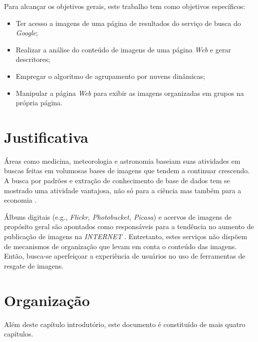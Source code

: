 Para alcançar os objetivos gerais, este trabalho tem como objetivos específicos:

\begin{itemize}

\item Ter acesso a imagens de uma página de resultados do serviço de busca do \emph{Google};

\item Realizar a análise do conteúdo de imagens de uma página \emph{Web} e gerar descritores;

\item Empregar o algoritmo de agrupamento por nuvens dinâmicas;

\item Manipular a página \emph{Web} para exibir as imagens organizadas em grupos na própria página.

\end{itemize}

\section{Justificativa}
\begin{comment}
\textbf{Justificativa está muito seca, coloque mais coisas: buscas em bancos de imagens, aplicações médicas, busca de padrões para fenômenos climáticos através de fotos de satélite, etc...}
\end{comment}

Áreas como medicina, meteorologia e astronomia baseiam suas atividades em buscas feitas em volumosas bases de imagens que tendem a continuar crescendo. A busca por padrões e extração de conhecimento de base de dados tem se mostrado uma atividade vantajosa, não só para a ciência mas também para a economia \cite{berry1997data}.

Álbuns digitais (e.g., \emph{Flickr, Photobucket, Picasa}) e acervos de imagens de propósito geral são apontados como responsáveis para a tendência no aumento de publicação de imagens na \emph{INTERNET} \cite{hartvedt2010using}. Entretanto, estes serviços não dispõem de mecanismos de organização que levam em conta o conteúdo das imagens. Então, busca-se aperfeiçoar a experiência de usuários no uso de ferramentas de resgate de imagens.

\section{Organização}
Além deste capítulo introdutório, este documento é constituído de mais quatro capítulos.\\

